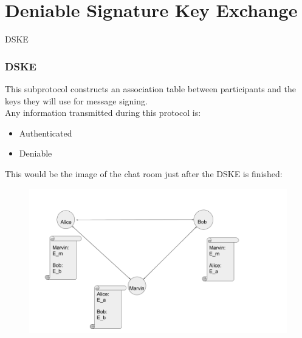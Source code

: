 \section{Deniable Signature Key Exchange}

\begin{frame}
\Huge{\centerline{DSKE}}
\end{frame}

\begin{frame}
  \frametitle{DSKE}
  This subprotocol constructs an association table between participants and the keys they will use for message signing.\\[0.3cm]

  Any information transmitted during this protocol is:

  \begin{itemize}
    \item Authenticated
    \item Deniable
  \end{itemize}

  This would be the image of the chat room just after the DSKE is finished:
  \begin{figure}
    \includegraphics[scale=0.2]{Figures/denAKE.png}
  \end{figure}
\end{frame}

